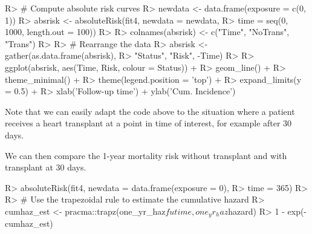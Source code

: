 \documentclass[
]{jss}
\begin{document}
\begin{CodeChunk}

\begin{CodeInput}
R> # Compute absolute risk curves
R> newdata <- data.frame(exposure = c(0, 1))
R> absrisk <- absoluteRisk(fit4, newdata = newdata, 
R>                         time = seq(0, 1000, length.out = 100))
R> 
R> colnames(absrisk) <- c("Time", "NoTrans", "Trans")
R> 
R> # Rearrange the data
R> absrisk <- gather(as.data.frame(absrisk),
R>                   "Status", "Risk", -Time)
R>  
R> ggplot(absrisk, aes(Time, Risk, colour = Status)) +
R>   geom_line() +
R>   theme_minimal() +
R>   theme(legend.position = 'top') +
R>   expand_limits(y = 0.5) +
R>   xlab('Follow-up time') + ylab('Cum. Incidence')
\end{CodeInput}
\end{CodeChunk}

Note that we can easily adapt the code above to the situation where a
patient receives a heart transplant at a point in time of interest, for
example after 30 days.

\begin{CodeChunk}

\end{CodeChunk}

We can then compare the 1-year mortality risk without transplant and
with transplant at 30 days.

\begin{CodeChunk}

\begin{CodeInput}
R> absoluteRisk(fit4, newdata = data.frame(exposure = 0),
R>              time = 365)
R> 
R> # Use the trapezoidal rule to estimate the cumulative hazard
R> cumhaz_est <- pracma::trapz(one_yr_haz$futime, one_yr_haz$hazard)
R> 1 - exp(-cumhaz_est)
\end{CodeInput}
\end{CodeChunk}
\end{document}
